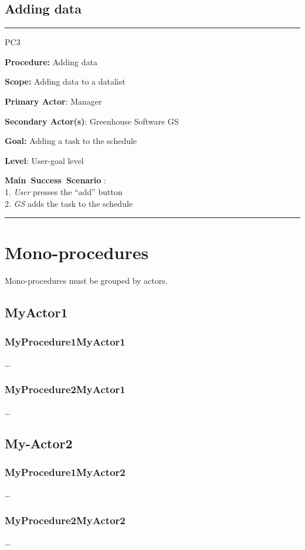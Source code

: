 \subsection{Adding data}
\vspace{0.5cm}
\hfill \break
\hrule
\begin{lyxlist}{PC3}
\small{
\item [\textbf{Procedure:}] Adding data
\item [\textbf{Scope:}] Adding data to a datalist
\item [\textbf{Primary Actor}:] Manager
\item [\textbf{Secondary Actor(s)}:] Greenhouse Software GS
\item [\textbf{Goal:}] Adding a task to the schedule
\item [\textbf{Level}:] User-goal level
\item [\textbf{Main~Success~Scenario}]:\\
1. \emph{User} presses the “add” button\\
2. \emph{GS} adds the task to the schedule\\
}
\end{lyxlist}
\hrule
\vspace{0.5cm}








\section{Mono-procedures}
Mono-procedures must be grouped by actors.


\subsection{MyActor1}

\subsubsection{MyProcedure1MyActor1}
\ldots

\subsubsection{MyProcedure2MyActor1}
\ldots


\subsection{My-Actor2}

\subsubsection{MyProcedure1MyActor2}
\ldots

\subsubsection{MyProcedure2MyActor2}
\ldots














